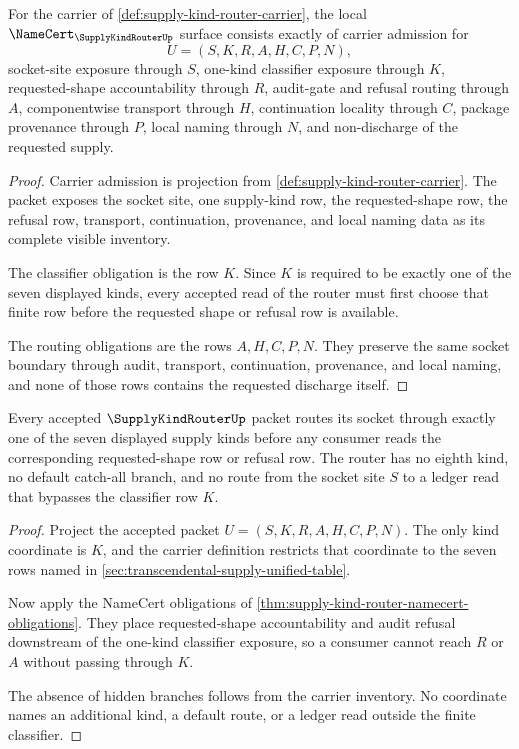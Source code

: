 \begin{theorem}
\label{thm:supply-kind-router-namecert-obligations}
For the carrier of \autoref{def:supply-kind-router-carrier}, the local $\NameCert_{\SupplyKindRouterUp}$ surface consists exactly of carrier admission for
$$
U=(S,K,R,A,H,C,P,N),
$$
socket-site exposure through $S$, one-kind classifier exposure through $K$, requested-shape accountability through $R$, audit-gate and refusal routing through $A$, componentwise transport through $H$, continuation locality through $C$, package provenance through $P$, local naming through $N$, and non-discharge of the requested supply.
\end{theorem}
\begin{proof}
Carrier admission is projection from \autoref{def:supply-kind-router-carrier}. The packet exposes the socket site, one supply-kind row, the requested-shape row, the refusal row, transport, continuation, provenance, and local naming data as its complete visible inventory.

The classifier obligation is the row $K$. Since $K$ is required to be exactly one of the seven displayed kinds, every accepted read of the router must first choose that finite row before the requested shape or refusal row is available.

The routing obligations are the rows $A,H,C,P,N$. They preserve the same socket boundary through audit, transport, continuation, provenance, and local naming, and none of those rows contains the requested discharge itself.
\end{proof}

\begin{theorem}
\label{thm:supply-kind-router-kind-exhaustion}
Every accepted $\SupplyKindRouterUp$ packet routes its socket through exactly one of the seven displayed supply kinds before any consumer reads the corresponding requested-shape row or refusal row. The router has no eighth kind, no default catch-all branch, and no route from the socket site $S$ to a ledger read that bypasses the classifier row $K$.
\end{theorem}
\begin{proof}
Project the accepted packet $U=(S,K,R,A,H,C,P,N)$. The only kind coordinate is $K$, and the carrier definition restricts that coordinate to the seven rows named in \autoref{sec:transcendental-supply-unified-table}.

Now apply the NameCert obligations of \autoref{thm:supply-kind-router-namecert-obligations}. They place requested-shape accountability and audit refusal downstream of the one-kind classifier exposure, so a consumer cannot reach $R$ or $A$ without passing through $K$.

The absence of hidden branches follows from the carrier inventory. No coordinate names an additional kind, a default route, or a ledger read outside the finite classifier.
\end{proof}

